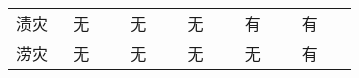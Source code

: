 \documentclass[a4paper,zihao=5]{ctexbook}
\begin{document}
\begin{table}
\begin{tabular}{p{0.14\linewidth}p{0.14\linewidth}p{0.14\linewidth}p{0.14\linewidth}p{0.14\linewidth}p{0.14\linewidth}}
        渍灾                            & 无                                                   & 无                                                   & 无                             & 有                                        & 有                                        \\
        涝灾                            & 无                                                   & 无                                                   & 无                             & 无                                        & 有                                        \\
        \bottomrule
    \end{tabular}
\end{table}


\end{document}
